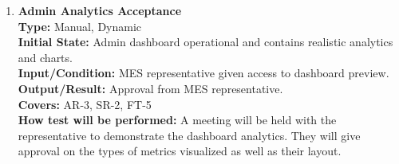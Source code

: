 \documentclass[12pt, titlepage]{article}
\begin{document}
\begin{enumerate}[label=\bfseries LF-\arabic*:, wide=0pt]
    \item \label{test-LF3} \textbf{Admin Analytics Acceptance}\\[2mm]
    {\bf Type:} Manual, Dynamic\\
    {\bf Initial State:} Admin dashboard operational and contains realistic analytics and charts.\\
    {\bf Input/Condition:} MES representative given access to dashboard preview.\\
    {\bf Output/Result:} Approval from MES representative.\\
    {\bf Covers:} AR-3, SR-2, FT-5\\
    {\bf How test will be performed:} A meeting will be held with the representative to demonstrate the dashboard analytics. They will give approval on the types of metrics visualized as well as their layout.
\end{enumerate}
\end{document}

